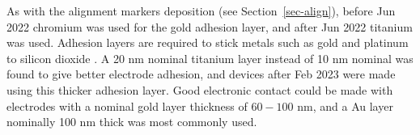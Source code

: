 \documentclass[
  a4paper,
]{scrbook}
\begin{document}
As with the alignment markers deposition (see Section~\ref{sec-align}),
before Jun 2022 chromium was used for the gold adhesion layer, and after
Jun 2022 titanium was used. Adhesion layers are required to stick metals
such as gold and platinum to silicon dioxide \autocite{Guarnieri2014}. A
20 nm nominal titanium layer instead of 10 nm nominal was found to give
better electrode adhesion, and devices after Feb 2023 were made using
this thicker adhesion layer. Good electronic contact could be made with
electrodes with a nominal gold layer thickness of \(60-100\) nm, and a
Au layer nominally 100 nm thick was most commonly used.

\begin{figure}

\begin{minipage}[t]{0.47\linewidth}

{\centering 


}

\subcaption{\label{fig-electrode-dmso-damage}}
\end{minipage}%
%
\begin{minipage}[t]{0.05\linewidth}

{\centering 

~

}

\end{minipage}%
%
\begin{minipage}[t]{0.47\linewidth}

{\centering 

\raisebox{-\height}{

}}
\end{minipage}
\end{figure}
\end{document}
